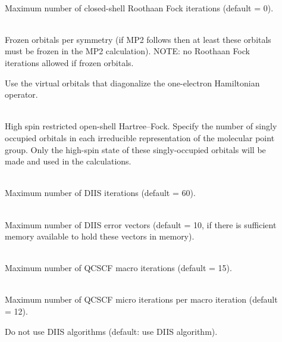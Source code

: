 \begin{description}
\item[]
   \\
  Maximum number of closed-shell Roothaan
  Fock iterations (default = 0).

\item[]
   \\
  Frozen orbitals per symmetry (if MP2 follows then at least these orbitals
  must be frozen in the MP2 calculation).
  NOTE: no Roothaan Fock iterations allowed if frozen orbitals.

\item[] Use the virtual orbitals that diagonalize the
  one-electron Hamiltonian operator.

\item[]
     \\
  High spin restricted open-shell Hartree--Fock. Specify the number of
  singly occupied orbitals in each irreducible representation
  of the molecular point group. Only the high-spin state of these
  singly-occupied orbitals will be made and used in the calculations.

\item[]
   \\
  Maximum number of DIIS iterations (default = 60).

\item[]
   \\
  Maximum number of DIIS error vectors
  (default = 10, if there is sufficient memory available to hold these
  vectors in memory).

\item[]
   \\
  Maximum number of QCSCF macro
 iterations (default = 15).


\item[]
   \\
  Maximum number of QCSCF micro iterations per macro iteration (default = 12).

\item[]
  Do not use DIIS algorithms (default: use DIIS algorithm).


\end{description}
